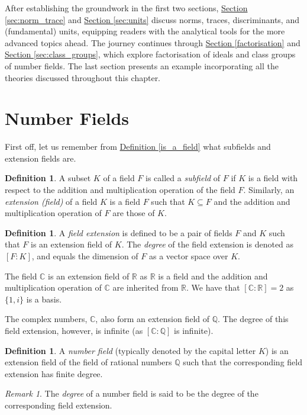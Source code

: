 \documentclass[openany, a4paper, 10pt]{book}
\theoremstyle{plain}
\theoremstyle{plain}
\theoremstyle{plain}
\theoremstyle{definition}
\newtheorem{definition}[theorem]{Definition}
\theoremstyle{plain}
\theoremstyle{definition}
\theoremstyle{remark}
\newtheorem*{remark}{Remark}
\newcommand{\defref}[1]{\hyperref[#1]{Definition \ref{#1}}}
\newcommand{\secref}[1]{\hyperref[#1]{Section \ref{#1}}}
\begin{document}
After establishing the groundwork in the first two sections, \secref{sec:norm_trace} and \secref{sec:units} discuss norms, traces, discriminants, and (fundamental) units, equipping readers with the analytical tools for the more advanced topics ahead.
The journey continues through \secref{factorisation} and \secref{sec:class_groups}, which explore factorisation of ideals and class groups of number fields.
The last section presents an example incorporating all the theories discussed throughout this chapter.


\section{Number Fields}\label{number_fields}
First off, let us remember from \defref{is_a_field} what subfields and extension fields are.
\begin{definition}
    A subset $K$ of a field $F$ is called a \textit{subfield} of $F$ if $K$ is a field with respect to the addition and multiplication operation of the field $F$.
    Similarly, an \textit{extension (field)} of a field $K$ is a field $F$ such that $K \subseteq F$ and the addition and multiplication operation of $F$ are those of $K$.
\end{definition}
\begin{definition}
    A \textit{field extension} is defined to be a pair of fields $F$ and $K$ such that $F$ is an extension field of $K$.
    The \textit{degree} of the field extension is denoted as $[F:K]$, and equals the dimension of $F$ as a vector space over $K$.
\end{definition}

\begin{examplebox}
    The field $\mathbb C$ is an extension field of $\mathbb R$ as $\mathbb R$ is a field and the addition and multiplication operation of $\mathbb C$ are inherited from $\mathbb R$.
    We have that $[\mathbb C: \mathbb R] = 2$ as $\{1, i\}$ is a basis.

    The complex numbers, $\mathbb C$, also form an extension field of $\mathbb Q$.
    The degree of this field extension, however, is infinite (as $[\mathbb C: \mathbb Q]$ is infinite).
\end{examplebox}


\begin{definition}
    A \textit{number field} (typically denoted by the capital letter $K$) is an extension field of the field of rational numbers $\mathbb Q$ such that the corresponding field extension has finite degree.
\end{definition}
\begin{remark}
    The \textit{degree} of a number field is said to be the degree of the corresponding field extension.
\end{remark}
\end{document}
